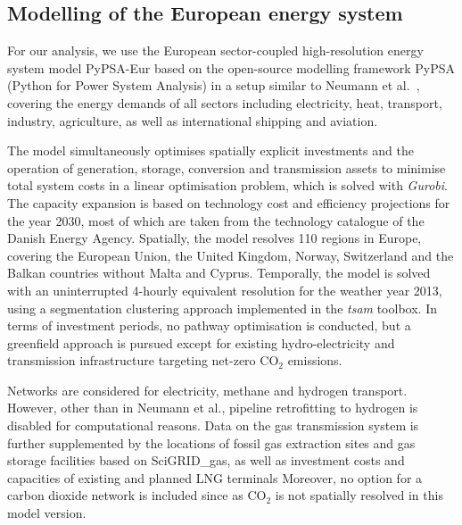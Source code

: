 

\subsection*{Modelling of the European energy system}

For our analysis, we use the European sector-coupled high-resolution energy
system model PyPSA-Eur\cite{horschPyPSAEurOpen2018a} based on the open-source
modelling framework PyPSA\cite{brownPyPSAPython2018} (Python for Power System
Analysis) in a setup similar to Neumann et al.~\cite{neumannPotentialRole2023},
covering the energy demands of all sectors including electricity, heat,
transport, industry, agriculture, as well as international shipping and
aviation.

The model simultaneously optimises spatially explicit investments and the
operation of generation, storage, conversion and transmission assets to minimise
total system costs in a linear optimisation problem, which is solved with
\textit{Gurobi}.\cite{gurobi} The capacity expansion is based on technology cost
and efficiency projections for the year 2030, most of which are taken from the
technology catalogue of the Danish Energy Agency.\cite{DEA} Spatially, the model
resolves 110 regions in Europe,\cite{frysztackiStrongEffect2021} covering the
European Union, the United Kingdom, Norway, Switzerland and the Balkan countries
without Malta and Cyprus. Temporally, the model is solved with an uninterrupted
4-hourly equivalent resolution for the weather year 2013, using a segmentation
clustering approach implemented in the \textit{tsam}
toolbox.\cite{hoffmannParetooptimalTemporal2022} In terms of investment periods,
no pathway optimisation is conducted, but a greenfield approach is pursued
except for existing hydro-electricity and transmission infrastructure targeting
net-zero CO$_2$ emissions.

Networks are considered for electricity, methane and hydrogen
transport.\cite{ENTSOE,plutaSciGRIDGas2022a} However, other than in Neumann et
al.,\cite{neumannPotentialRole2023} pipeline retrofitting to hydrogen is
disabled for computational reasons. Data on the gas transmission system is
further supplemented by the locations of fossil gas extraction sites and gas
storage facilities based on SciGRID\_gas,\cite{plutaSciGRIDGas2022a} as well as
investment costs and capacities of existing and planned LNG
terminals\cite{instituteforenergyeconomicsandfinancialanalysisEuropeanLNG2023}
Moreover, no option for a carbon dioxide network is included since as CO$_2$ is
not spatially resolved in this model version.\cite{hofmannDesigningCO22023}

